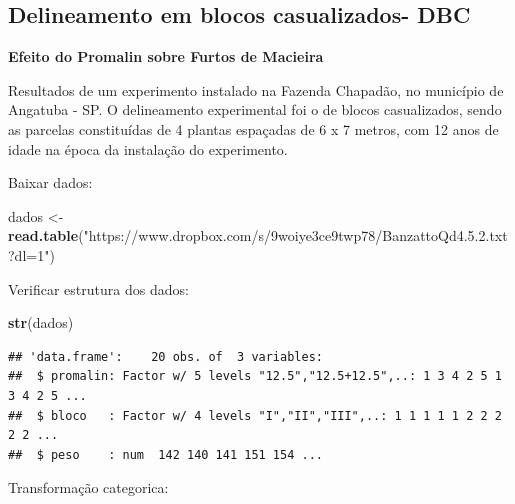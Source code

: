 \documentclass[
]{book}
\newenvironment{Shaded}{\begin{snugshade}}{\end{snugshade}}
\newcommand{\KeywordTok}[1]{\textcolor[rgb]{0.13,0.29,0.53}{\textbf{#1}}}
\newcommand{\NormalTok}[1]{#1}
\newcommand{\OperatorTok}[1]{\textcolor[rgb]{0.81,0.36,0.00}{\textbf{#1}}}
\newcommand{\StringTok}[1]{\textcolor[rgb]{0.31,0.60,0.02}{#1}}
\begin{document}
\hypertarget{delineamento-em-blocos-casualizados--dbc}{%
\subsection{Delineamento em blocos casualizados- DBC}\label{delineamento-em-blocos-casualizados--dbc}}

\textbf{Efeito do Promalin sobre Furtos de Macieira}

Resultados de um experimento instalado na Fazenda Chapadão, no município de Angatuba - SP. O delineamento experimental foi o de blocos casualizados, sendo as parcelas constituídas de 4 plantas espaçadas de 6 x 7 metros, com 12 anos de idade na época da instalação do experimento.

Baixar dados:

\begin{Shaded}
\begin{Highlighting}[]
\NormalTok{dados <-}\StringTok{ }\KeywordTok{read.table}\NormalTok{(}\StringTok{"https://www.dropbox.com/s/9woiye3ce9twp78/BanzattoQd4.5.2.txt?dl=1"}\NormalTok{)}
\end{Highlighting}
\end{Shaded}

Verificar estrutura dos dados:

\begin{Shaded}
\begin{Highlighting}[]
\KeywordTok{str}\NormalTok{(dados)}
\end{Highlighting}
\end{Shaded}

\begin{verbatim}
## 'data.frame':    20 obs. of  3 variables:
##  $ promalin: Factor w/ 5 levels "12.5","12.5+12.5",..: 1 3 4 2 5 1 3 4 2 5 ...
##  $ bloco   : Factor w/ 4 levels "I","II","III",..: 1 1 1 1 1 2 2 2 2 2 ...
##  $ peso    : num  142 140 141 151 154 ...
\end{verbatim}

Transformação categorica:

\begin{Shaded}
\end{Shaded}
\end{document}

